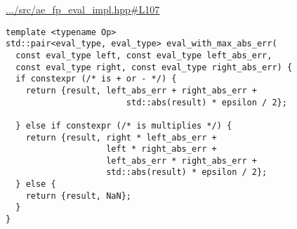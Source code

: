 \href{https://github.com/mfdeakin/adaptive_predicates/blob/main/src/ae_fp_eval_impl.hpp#L107}{.../src/ae\_fp\_eval\_impl.hpp\#L107}
\begin{lstlisting}[basicstyle=\small\ttfamily]
template <typename Op>
std::pair<eval_type, eval_type> eval_with_max_abs_err(
  const eval_type left, const eval_type left_abs_err,
  const eval_type right, const eval_type right_abs_err) {
  if constexpr (/* is + or - */) {
    return {result, left_abs_err + right_abs_err +
                        std::abs(result) * epsilon / 2};

  } else if constexpr (/* is multiplies */) {
    return {result, right * left_abs_err +
                    left * right_abs_err +
                    left_abs_err * right_abs_err +
                    std::abs(result) * epsilon / 2};
  } else {
    return {result, NaN};
  }
}
\end{lstlisting}
